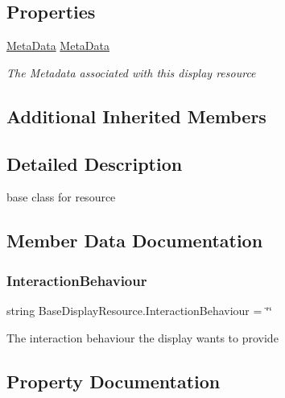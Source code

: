 \subsection*{Properties}
\begin{DoxyCompactItemize}
\item 
\mbox{\hyperlink{class_meta_data}{Meta\+Data}} \mbox{\hyperlink{class_base_display_resource_a0a9f0a877d169dd6c5c07c66ae563618}{Meta\+Data}}
\begin{DoxyCompactList}\small\item\em The Metadata associated with this display resource \end{DoxyCompactList}\end{DoxyCompactItemize}
\subsection*{Additional Inherited Members}


\subsection{Detailed Description}
base class for resource 



\subsection{Member Data Documentation}
\mbox{\label{class_base_display_resource_a076a3844786354934f897ff2e9b24a18}} 
\subsubsection{\texorpdfstring{Interaction\+Behaviour}{InteractionBehaviour}}
{\footnotesize\ttfamily string Base\+Display\+Resource.\+Interaction\+Behaviour = \char`\"{}\char`\"{}}



The interaction behaviour the display wants to provide 



\subsection{Property Documentation}
\mbox{\label{class_base_display_resource_a0a9f0a877d169dd6c5c07c66ae563618}} 

